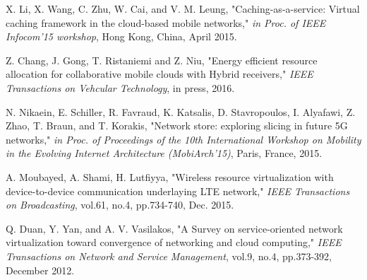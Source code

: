\documentclass[12pt,draftclsnofoot,onecolumn]{IEEEtran}
\begin{document}
\begin{thebibliography}{1}
X. Li, X. Wang, C. Zhu, W. Cai, and V. M. Leung,
"Caching-as-a-service: Virtual caching framework in the
cloud-based mobile networks," \emph{in Proc. of IEEE Infocom'15
workshop}, Hong Kong, China, April 2015.


Z. Chang, J. Gong, T. Ristaniemi and Z. Niu, "Energy efficient
resource allocation for collaborative mobile clouds with Hybrid
receivers," \emph{IEEE Transactions on Vehcular Technology}, in
press, 2016.


N. Nikaein, E. Schiller, R. Favraud, K. Katsalis, D. Stavropoulos,
I. Alyafawi, Z. Zhao, T. Braun, and T. Korakis, "Network store:
exploring slicing in future 5G networks," \emph{in Proc. of
Proceedings of the 10th International Workshop on Mobility in the
Evolving Internet Architecture (MobiArch'15)}, Paris, France,
2015.

A. Moubayed, A. Shami, H. Lutfiyya, "Wireless resource
virtualization with device-to-device communication underlaying LTE
network," \emph{IEEE Transactions on Broadcasting}, vol.61, no.4,
pp.734-740, Dec. 2015.

Q. Duan, Y. Yan, and A. V. Vasilakos, "A Survey on service-oriented
network virtualization toward convergence of networking and cloud
computing," \emph{IEEE Transactions on Network and Service
Management}, vol.9, no.4, pp.373-392, December 2012.




\end{thebibliography}
\end{document}

